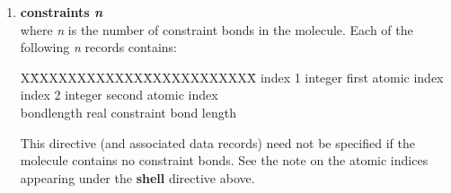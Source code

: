 \begin{enumerate}
\begin{table}[ht]
\begin{centering}
\end{centering}

{\bf Note:} bond potentials with a dash (-) as the first character of
the keyword, do not contribute to the {\em excluded atoms list} (see
section \ref{fieldintro}). In this case \D{} will also calculate the
nonbonded pair potentials between the described atoms, unless these
are deactivated by another potential specification.

\end{table}

\item {\bf constraints {\em n}}\\
where {\em n} is the number of constraint bonds in the
molecule.  Each of the following {\em n} records contains:
\begin{tabbing}
X\=XXXXXXXXXXXX\=XXXXXXXXXXXX\=\kill
\> index 1 \> integer \> first atomic index\\
\> index 2 \> integer \> second atomic index\\
\> bondlength \> real \> constraint bond length\\
\end{tabbing}
This directive (and associated data records) need not be specified if
the molecule contains no constraint bonds.
See the note on the atomic indices appearing under the {\bf shell}
directive above.


\end{enumerate}
